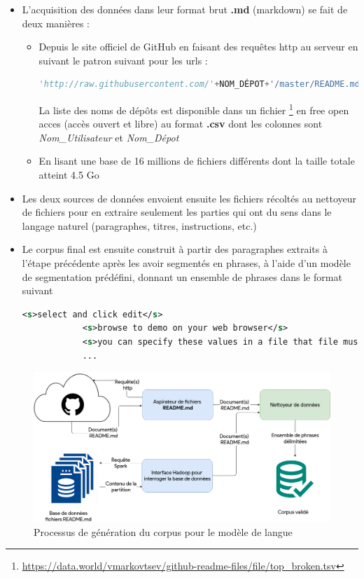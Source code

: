 		\begin{itemize}
			\item L'acquisition des données dans leur format brut \textbf{.md} (markdown) se fait de deux manières :
			\begin{itemize}
				\item Depuis le site officiel de GitHub en faisant des requêtes http au serveur en suivant le patron suivant pour les urls : 
				\begin{lstlisting}[language=python]
				'http://raw.githubusercontent.com/'+NOM_DÉPOT+'/master/README.md'\end{lstlisting}
				La liste des noms de dépôts est disponible dans un fichier \footnote{\url{https://data.world/vmarkovtsev/github-readme-files/file/top_broken.tsv}} en free open acces (accès ouvert et libre) au format \textbf{.csv} dont les colonnes sont \textit{Nom\_Utilisateur} et \textit{Nom\_Dépot} 
				\item En lisant une base de 16 millions de fichiers différents dont la taille totale atteint 4.5 Go  
			\end{itemize}
			\item Les deux sources de données envoient ensuite les fichiers récoltés au nettoyeur de fichiers pour en extraire seulement les parties qui ont du sens dans le langage naturel (paragraphes, titres, instructions, etc.)
			\item Le corpus final est ensuite construit à partir des paragraphes extraits à l'étape précédente après les avoir segmentés en phrases, à l'aide d'un modèle de segmentation prédéfini, donnant un ensemble de phrases dans le format suivant \begin{lstlisting}[language=xml]
			<s>select and click edit</s>
			<s>browse to demo on your web browser</s>
			<s>you can specify these values in a file that file must be home</s>
			...\end{lstlisting}
		\end{itemize}
	
	\begin{figure}[H] 
		\centering
		\includegraphics[width=0.88\linewidth]{images/Conception/ASR/lm_gathering.png}
		\caption{Processus de génération du corpus pour le modèle de langue}
		\label{fig:lm_gathering}
	\end{figure}
